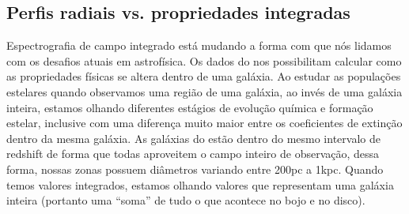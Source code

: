 \subsection{Perfis radiais vs. propriedades integradas}
\label{sec:difextin:nextsteps:SDSSvsCALIFA}

Espectrografia de campo integrado está mudando a forma com que nós lidamos com os desafios atuais em
astrofísica. Os dados do \PCAL nos possibilitam calcular como as propriedades físicas se altera
dentro de uma galáxia. Ao estudar as populações estelares quando observamos uma região de uma
galáxia, ao invés de uma galáxia inteira, estamos olhando diferentes estágios de evolução química e
formação estelar, inclusive com uma diferença muito maior entre os coeficientes de extinção dentro
da mesma galáxia. As galáxias do \CAL estão dentro do mesmo intervalo de redshift de forma que todas
aproveitem o campo inteiro de observação, dessa forma, nossas zonas possuem diâmetros variando entre
200pc a 1kpc. Quando temos valores integrados, estamos olhando valores que representam uma galáxia
inteira (portanto uma ``soma'' de tudo o que acontece no bojo e no disco).  



